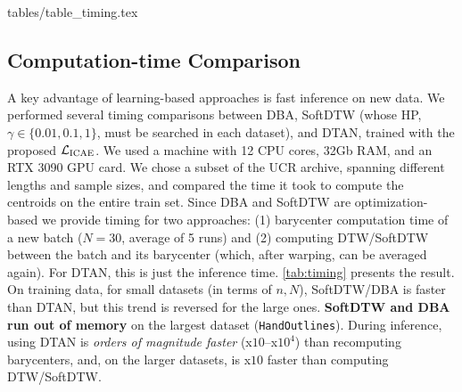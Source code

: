 {tables/table_timing.tex}

\subsection{Computation-time Comparison}\label{Sec:Results:sub:timming}
A key advantage of learning-based approaches is fast inference on new data. 
We performed several timing comparisons
between DBA, SoftDTW (whose HP, $\gamma\in\{0.01,0.1,1\}$, must be searched in each dataset), and DTAN, trained with the proposed $\mathcal{L}_{\mathrm{ICAE}}$. We used a machine with 12 CPU cores, 32Gb RAM, and an RTX 3090 GPU card. We chose a subset of the UCR archive, spanning different lengths and sample sizes, and compared the time it took to compute the centroids on the entire train set. Since DBA and SoftDTW are optimization-based we provide timing for two approaches: (1) barycenter computation time of a new batch ($N=30$, average of 5 runs) and (2) computing DTW/SoftDTW between the batch and its barycenter (which, after warping, can be averaged again). For DTAN, this is just the inference time. \autoref{tab:timing} presents the result. On training data, for small datasets (in terms of $n, N$), SoftDTW/DBA is faster than DTAN, but this trend is reversed for the large ones. \textbf{SoftDTW and DBA run out of memory} on the largest dataset (\texttt{HandOutlines}). During inference, using DTAN is \emph{orders of magnitude faster} (x$10$--x$10^{4}$) than recomputing barycenters, and, on the larger datasets, is x$10$ faster than computing DTW/SoftDTW. 

